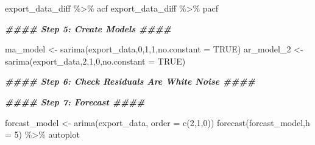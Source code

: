\documentclass[
]{article}
\newenvironment{Shaded}{\begin{snugshade}}{\end{snugshade}}
\newcommand{\AttributeTok}[1]{\textcolor[rgb]{0.77,0.63,0.00}{#1}}
\newcommand{\ConstantTok}[1]{\textcolor[rgb]{0.00,0.00,0.00}{#1}}
\newcommand{\DecValTok}[1]{\textcolor[rgb]{0.00,0.00,0.81}{#1}}
\newcommand{\DocumentationTok}[1]{\textcolor[rgb]{0.56,0.35,0.01}{\textbf{\textit{#1}}}}
\newcommand{\FunctionTok}[1]{\textcolor[rgb]{0.00,0.00,0.00}{#1}}
\newcommand{\NormalTok}[1]{#1}
\newcommand{\OtherTok}[1]{\textcolor[rgb]{0.56,0.35,0.01}{#1}}
\newcommand{\SpecialCharTok}[1]{\textcolor[rgb]{0.00,0.00,0.00}{#1}}
\begin{document}
\begin{Shaded}
\begin{Highlighting}[]
\NormalTok{export\_data\_diff }\SpecialCharTok{\%\textgreater{}\%}\NormalTok{ acf}
\NormalTok{export\_data\_diff }\SpecialCharTok{\%\textgreater{}\%}\NormalTok{ pacf}


\DocumentationTok{\#\#\#\# Step 5: Create Models \#\#\#\#}

\NormalTok{ma\_model }\OtherTok{\textless{}{-}} \FunctionTok{sarima}\NormalTok{(export\_data,}\DecValTok{0}\NormalTok{,}\DecValTok{1}\NormalTok{,}\DecValTok{1}\NormalTok{,}\AttributeTok{no.constant =} \ConstantTok{TRUE}\NormalTok{)}
\NormalTok{ar\_model\_2 }\OtherTok{\textless{}{-}} \FunctionTok{sarima}\NormalTok{(export\_data,}\DecValTok{2}\NormalTok{,}\DecValTok{1}\NormalTok{,}\DecValTok{0}\NormalTok{,}\AttributeTok{no.constant =} \ConstantTok{TRUE}\NormalTok{)}


\DocumentationTok{\#\#\#\# Step 6: Check Residuals Are White Noise \#\#\#\#}

\DocumentationTok{\#\#\#\# Step 7: Forecast \#\#\#\#}

\NormalTok{forcast\_model }\OtherTok{\textless{}{-}} \FunctionTok{arima}\NormalTok{(export\_data, }\AttributeTok{order =} \FunctionTok{c}\NormalTok{(}\DecValTok{2}\NormalTok{,}\DecValTok{1}\NormalTok{,}\DecValTok{0}\NormalTok{))}
\FunctionTok{forecast}\NormalTok{(forcast\_model,}\AttributeTok{h =} \DecValTok{5}\NormalTok{) }\SpecialCharTok{\%\textgreater{}\%}\NormalTok{ autoplot}
\end{Highlighting}
\end{Shaded}
\end{document}
